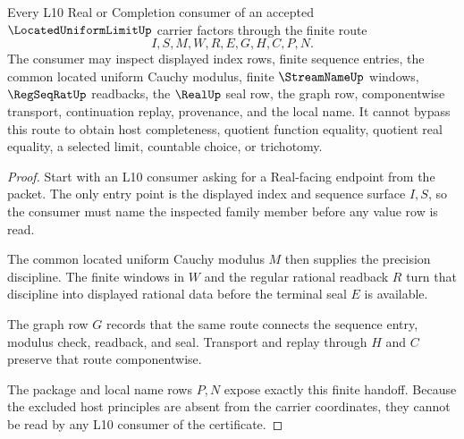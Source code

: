 \begin{theorem}
\label{thm:located-uniform-limit-l10-handoff}
Every L10 Real or Completion consumer of an accepted
$\LocatedUniformLimitUp$ carrier factors through the finite route
$$
I,S,M,W,R,E,G,H,C,P,N .
$$
The consumer may inspect displayed index rows, finite sequence entries, the
common located uniform Cauchy modulus, finite $\StreamNameUp$ windows,
$\RegSeqRatUp$ readbacks, the $\RealUp$ seal row, the graph row, componentwise
transport, continuation replay, provenance, and the local name. It cannot
bypass this route to obtain host completeness, quotient function equality,
quotient real equality, a selected limit, countable choice, or trichotomy.
\end{theorem}
\begin{proof}
Start with an L10 consumer asking for a Real-facing endpoint from the packet.
The only entry point is the displayed index and sequence surface $I,S$, so the
consumer must name the inspected family member before any value row is read.

The common located uniform Cauchy modulus $M$ then supplies the precision
discipline. The finite windows in $W$ and the regular rational readback $R$
turn that discipline into displayed rational data before the terminal seal
$E$ is available.

The graph row $G$ records that the same route connects the sequence entry,
modulus check, readback, and seal. Transport and replay through $H$ and $C$
preserve that route componentwise.

The package and local name rows $P,N$ expose exactly this finite handoff.
Because the excluded host principles are absent from the carrier coordinates,
they cannot be read by any L10 consumer of the certificate.
\end{proof}

